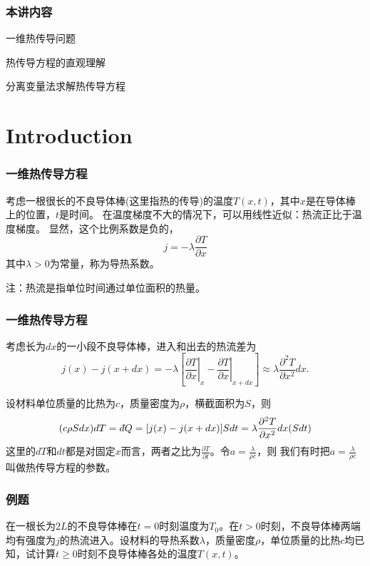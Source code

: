 \documentclass[CJK]{beamer}
\date{}
\begin{document}
  \bch
{}

\begin{frame}
  \frametitle{本讲内容}
  
  \bitem
\item{一维热传导问题}  
\item{热传导方程的直观理解}
\item{分离变量法求解热传导方程}
  \eitem
  
\end{frame}

\section{Introduction}

\begin{frame}
  \frametitle{一维热传导方程}
  
  考虑一根很长的不良导体棒(这里指热的传导)的温度$T(x, t)$，其中$x$是在导体棒上的位置，$t$是时间。
  在温度梯度不大的情况下，可以用线性近似：{\blue 热流正比于温度梯度}。
  显然，这个比例系数是负的，
  $$ j =  -\lambda \frac{\partial T}{\partial x} $$
  其中$\lambda >0$为常量，称为{\blue 导热系数}。


  {\small 注：热流是指单位时间通过单位面积的热量。}
\end{frame}


\begin{frame}
  \frametitle{一维热传导方程}
  

  考虑长为$dx$的一小段不良导体棒，进入和出去的热流差为
  $$j(x)-j(x+dx) = -\lambda \left[\left.\frac{\partial T}{\partial x}\right\vert_{x}-\left.\frac{\partial T}{\partial x}\right\vert_{x+dx}\right]\approx \lambda \frac{\partial^2 T}{\partial x^2} dx. $$
\end{frame}
\begin{frame}
  设材料单位质量的比热为$c$，质量密度为$\rho$，横截面积为$S$，则
  $$ (c \rho S dx) dT = \dbar Q = [j(x)-j(x+dx)] S dt =  \lambda \frac{\partial^2 T}{\partial x^2} dx  (S dt) $$
  这里的$dT$和$dt$都是对固定$x$而言，两者之比为$\frac{\partial T}{\partial t}$。令$a = \frac{\lambda}{\rho c}$，则
  我们有时把{\blue $a=\frac{\lambda}{\rho c}$}叫做{\blue 热传导方程的参数}。
  
\end{frame}


\begin{frame}
  \frametitle{例题}
  
  
  在一根长为$2L$的不良导体棒在$t=0$时刻温度为$T_0$。在$t>0$时刻，不良导体棒两端均有强度为$j$的热流进入。设材料的导热系数$\lambda$，质量密度$\rho$，单位质量的比热$c$均已知，试计算$t\ge 0$时刻不良导体棒各处的温度$T(x,t)$。
  
\end{frame}
\end{document}
